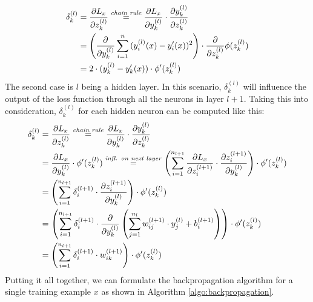 \begin{equation}
\label{eq:delta-output}
\begin{split}
  \delta_k^{(l)} & = \frac{\partial L_x}{\partial z_k^{(l)}}
  \stackrel{\text{\textit{chain rule}}}{=} \frac{\partial
    L_x}{\partial y_k^{(l)}} \cdot \frac{\partial y_k^{(l)}}{\partial
    z_k^{(l)}} \\ & = \left(\frac{\partial}{\partial y_k^{(l)}}
  \sum_{i=1}^{n}{(y_i^{(l)}(x)-y_i'(x))^2}\right) \cdot \frac{\partial}{\partial
    z_k^{(l)}} \phi(z_k^{(l)}) \\ & = 2 \cdot (y_k^{(l)}-y_k'(x)) \cdot \phi'(z_k^{(l)})
\end{split}
\end{equation}
The second case is \(l\) being a hidden layer. In this scenario,
\(\delta_k^{(l)}\) will influence the output of the loss function
through all the neurons in layer \(l+1\). Taking this into
consideration, \(\delta_k^{(l)}\) for each hidden neuron can be
computed like this:
\begin{equation}
\label{eq:delta-hidden}
  \begin{split}
    \delta_k^{(l)} & = \frac{\partial L_x}{\partial z_k^{(l)}}
  \stackrel{\text{\textit{chain rule}}}{=} \frac{\partial
    L_x}{\partial y_k^{(l)}} \cdot \frac{\partial y_k^{(l)}}{\partial
    z_k^{(l)}} \\ & = \frac{\partial L_x}{\partial y_k^{(l)}} \cdot
  \phi'(z_k^{(l)}) \stackrel{\text{\textit{infl. on next layer}}}{=} \left(\sum_{i=1}^{n_{l+1}}{\frac{\partial
      L_x}{\partial
  z_i^{(l+1)}} \cdot \frac{\partial z_i^{(l+1)}}{\partial
      y_k^{(l)}}}\right) \cdot \phi'(z_k^{(l)})
  \\ & = \left(\sum_{i=1}^{n_{l+1}}{\delta_i^{(l+1)} \cdot
    \frac{\partial z_i^{(l+1)}}{\partial
      y_k^{(l)}}}\right) \cdot \phi'(z_k^{(l)})
  \\ & = \left(\sum_{i=1}^{n_{l+1}}{\delta_i^{(l+1)} \cdot
    \frac{\partial}{\partial y_k^{(l)}} \left(
    \sum_{j=1}^{n_{l}}{w_{ij}^{(l+1)} \cdot y_j^{(l)}} + b_i^{(l+1)}
    \right)}\right)
  \cdot \phi'(z_k^{(l)})
  \\ & = \left(\sum_{i=1}^{n_{l+1}}{\delta_i^{(l+1)} \cdot w_{ik}^{(l+1)}}\right)
  \cdot \phi'(z_k^{(l)})
  \end{split}
\end{equation}
Putting it all together, we can formulate the backpropagation
algorithm for a single training example \(x\) as shown in Algorithm \ref{algo:backpropagation}.
